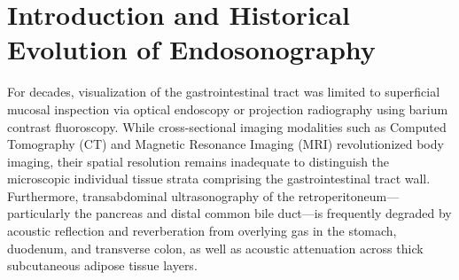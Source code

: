 \documentclass[11pt,a4paper]{article}
\begin{document}
\begin{abstract}
The technological evolution of \textbf{EUS-guided tissue acquisition} is examined from Fine Needle Aspiration (EUS-FNA) to modern core Fine Needle Biopsy (EUS-FNB) featuring Franseen, fork-tip, and reverse-bevel crown architectures that preserve micro-tissue architecture for immunohistochemistry and next-generation sequencing. Finally, we formulate the cutting-edge frontier of \textbf{interventional EUS}, including celiac plexus neurolysis (CPN), lumen-apposing metal stent (LAMS) drainage of walled-off pancreatic necrosis (WON), EUS-guided biliary drainage (EUS-BD), EUS-guided gastrojejunostomy (EUS-GJ), Contrast-Enhanced Harmonic EUS (CH-EUS), elastography, and artificial intelligence integration.
\end{abstract}

\tableofcontents
\newpage

\section{Introduction and Historical Evolution of Endosonography}
For decades, visualization of the gastrointestinal tract was limited to superficial mucosal inspection via optical endoscopy or projection radiography using barium contrast fluoroscopy. While cross-sectional imaging modalities such as Computed Tomography (CT) and Magnetic Resonance Imaging (MRI) revolutionized body imaging, their spatial resolution remains inadequate to distinguish the microscopic individual tissue strata comprising the gastrointestinal tract wall. Furthermore, transabdominal ultrasonography of the retroperitoneum—particularly the pancreas and distal common bile duct—is frequently degraded by acoustic reflection and reverberation from overlying gas in the stomach, duodenum, and transverse colon, as well as acoustic attenuation across thick subcutaneous adipose tissue layers.
\end{document}
